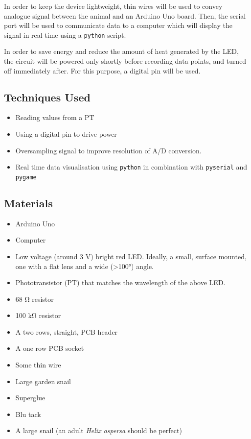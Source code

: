 \documentclass[]{article}
\begin{document}
In order to keep the device lightweight, thin wires will be used to
convey analogue signal between the animal and an Arduino Uno board.
Then, the serial port will be used to communicate data to a computer
which will display the signal in real time using a \texttt{python}
script.

In order to save energy and reduce the amount of heat generated by the
LED, the circuit will be powered only shortly before recording data
points, and turned off immediately after. For this purpose, a digital
pin will be used.

\subsection{Techniques Used}\label{techniques-used}

\begin{itemize}
\itemsep1pt\parskip0pt
\item
  Reading values from a PT
\item
  Using a digital pin to drive power
\item
  Oversampling signal to improve resolution of A/D conversion.
\item
  Real time data visualisation using \texttt{python} in combination with
  \texttt{pyserial} and \texttt{pygame}
\end{itemize}

\subsection{Materials}\label{materials}

\begin{itemize}
\itemsep1pt\parskip0pt
\item
  Arduino Uno
\item
  Computer
\item
  Low voltage (around 3 V) bright red LED. Ideally, a small, surface
  mounted, one with a flat lens and a wide (\textgreater{}100°) angle.
\item
  Phototransistor (PT) that matches the wavelength of the above LED.
\item
  68 Ω resistor
\item
  100 kΩ resistor
\item
  A two rows, straight, PCB header
\item
  A one row PCB socket
\item
  Some thin wire
\item
  Large garden snail
\item
  Superglue
\item
  Blu tack
\item
  A large snail (an adult \emph{Helix aspersa} should be perfect)
\end{itemize}
\end{document}
